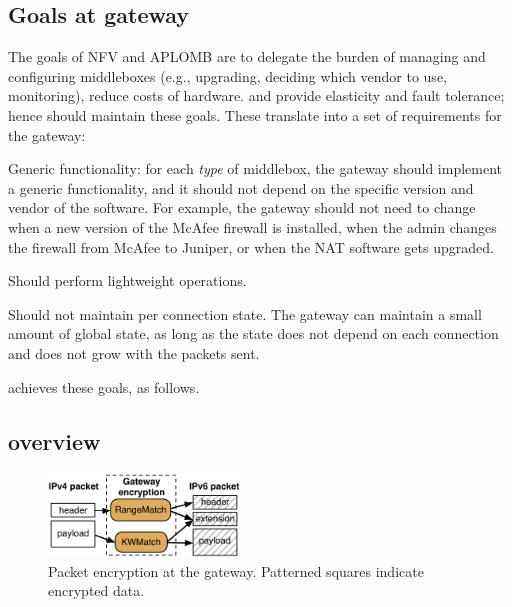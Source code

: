 \subsection{Goals at gateway}

The goals of NFV and APLOMB are to delegate the burden of managing and configuring
middleboxes (e.g., upgrading, deciding which vendor to use, monitoring), reduce costs of hardware. 
and provide elasticity and fault tolerance; hence \sys should maintain these goals.
%
These translate into a set of requirements for the gateway:
\begin{CompactItemize}
\item Generic functionality: for each {\em type} of middlebox, the gateway should implement a generic functionality, and it should not depend on the specific version and vendor of the software. For example, the gateway should not need to change when a new version of the McAfee firewall is installed, when the admin changes the firewall  from McAfee to Juniper, or when the NAT software gets upgraded. 
\item Should perform lightweight operations.
\item Should not maintain per connection state. The gateway can maintain a small amount of global state, as long as the state does not depend on each connection and does not grow with the packets sent.  
\end{CompactItemize}


\sys achieves these goals, as follows. 


\subsection{\sys overview}


\begin{figure}[t!]
\centering
  \includegraphics[width=2.0in]{fig/packet.pdf}
\caption{Packet encryption at the gateway. Patterned squares indicate encrypted data. \label{fig:packet}}
\end{figure}





